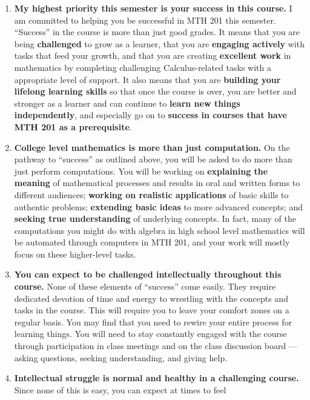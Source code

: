 \documentclass[]{article}
\providecommand{\tightlist}{%
  \setlength{\itemsep}{0pt}\setlength{\parskip}{0pt}}
\begin{document}
\begin{enumerate}
\def\labelenumi{\arabic{enumi}.}
\tightlist
\item
  \textbf{My highest priority this semester is your success in this
  course.} I am committed to helping you be successful in MTH 201 this
  semester. ``Success'' in the course is more than just good grades. It
  means that you are being \textbf{challenged} to grow as a learner,
  that you are \textbf{engaging actively} with tasks that feed your
  growth, and that you are creating \textbf{excellent work} in
  mathematics by completing challenging Calculus-related tasks with a
  appropriate level of support. It also means that you are
  \textbf{building your lifelong learning skills} so that once the
  course is over, you are better and stronger as a learner and can
  continue to \textbf{learn new things independently}, and especially go
  on to \textbf{success in courses that have MTH 201 as a prerequisite}.
\item
  \textbf{College level mathematics is more than just computation.} On
  the pathway to ``success'' as outlined above, you will be asked to do
  more than just perform computations. You will be working on
  \textbf{explaining the meaning} of mathematical processes and results
  in oral and written forms to different audiences; \textbf{working on
  realistic applications} of basic skills to authentic problems;
  \textbf{extending basic ideas} to more advanced concepts; and
  \textbf{seeking true understanding} of underlying concepts. In fact,
  many of the computations you might do with algebra in high school
  level mathematics will be automated through computers in MTH 201, and
  your work will mostly focus on these higher-level tasks.
\item
  \textbf{You can expect to be challenged intellectually throughout this
  course.} None of these elements of ``success'' come easily. They
  require dedicated devotion of time and energy to wrestling with the
  concepts and tasks in the course. This will require you to leave your
  comfort zones on a regular basis. You may find that you need to rewire
  your entire process for learning things. You will need to stay
  constantly engaged with the course through participation in class
  meetings and on the class discussion board --- asking questions,
  seeking understanding, and giving help.\\
\item
  \textbf{Intellectual struggle is normal and healthy in a challenging
  course.} Since none of this is easy, you can expect at times to feel

\end{enumerate}
\end{document}

